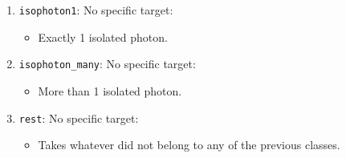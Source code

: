 \documentclass[11pt, hidelinks, a4paper]{scrartcl}
\begin{document}
{\begin{multicols}{2}
\begin{enumerate}
      \item \texttt{isophoton1}: No specific target:
      \begin{itemize}
          \item Exactly 1 isolated photon.
      \end{itemize}
      \item \texttt{isophoton\_many}: No specific target:
      \begin{itemize}
          \item More than 1 isolated photon.
      \end{itemize}
      \item \texttt{rest}: No specific target:
      \begin{itemize}
          \item Takes whatever did not belong to any of the previous classes.
      \end{itemize}
  \end{enumerate}
\end{multicols}}
\end{document}

